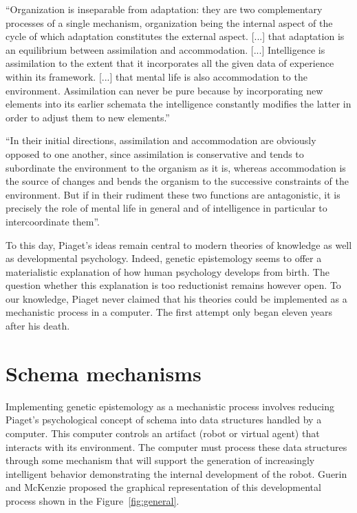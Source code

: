 \documentclass[runningheads]{llncs}
\begin{document}
\begin{adjustwidth}{1cm}{1cm}
``Organization is inseparable from adaptation: they are two complementary processes of a single mechanism, organization being the internal aspect of the cycle of which adaptation constitutes the external aspect. [...] that adaptation is an equilibrium between assimilation and accommodation. [...] Intelligence is assimilation to the extent that it incorporates all the given data of experience within its framework. [...] that mental life is also accommodation to the environment. Assimilation can never be pure because by incorporating new elements into its earlier schemata the intelligence constantly modifies the latter in order to adjust them to new elements.'' \cite{piaget_origins_1955}

``In their initial directions, assimilation and accommodation are obviously opposed to one another, since assimilation is conservative and tends to subordinate the environment to the organism as it is, whereas accommodation is the source of changes and bends the organism to the successive constraints of the environment. But if in their rudiment these two functions are antagonistic, it is precisely the role of mental life in general and of intelligence in particular to intercoordinate them''. \cite{piaget_reality_1955}
\\

\end{adjustwidth}

To this day, Piaget's ideas remain central to modern theories of knowledge as well as developmental psychology. 
Indeed, genetic epistemology seems to offer a materialistic explanation of how human psychology develops from birth.
The question whether this explanation is too reductionist remains however open. 
To our knowledge, Piaget never claimed that his theories could be implemented as a mechanistic process in a computer. 
The first attempt only began eleven years after his death.

\cite{chaput_constructivist_2004}
\cite{guerin_piagetian_2008}
\cite{miller_building_2018}


\section{Schema mechanisms}
\label{sec:schema}

Implementing genetic epistemology as a mechanistic process involves reducing Piaget's psychological concept of schema into data structures handled by a computer. 
This computer controls an artifact (robot or virtual agent) that interacts with its environment.
The computer must process these data structures through some mechanism that will support the generation of increasingly intelligent behavior demonstrating the internal development of the robot.
Guerin and McKenzie \cite{guerin_survey_2013} proposed the graphical representation of this developmental process shown in the Figure~\ref{fig:general}.
\end{document}
